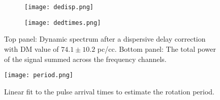 \documentclass[12pt]{article}
\begin{document}
\begin{figure}
\centering
  \begin{subfigure}[h]{1\textwidth}
  	\centering
    \texttt{[image: dedisp.png]}
  \end{subfigure}
  \begin{subfigure}[h]{1\textwidth}
  	\centering
    \texttt{[image: dedtimes.png]}
  \end{subfigure}
  \caption{Top panel: Dynamic spectrum after a dispersive delay correction with $\mbox{DM} $ value of $ 74.1 \pm 10.2$ pc/cc. Bottom panel: The total power of the signal summed across the frequency channels.} 
\end{figure}

\newpage
\begin{figure}
\centering
\texttt{[image: period.png]}
\caption{Linear fit to the pulse arrival times to estimate the rotation period.}
\end{figure}
\end{document}
